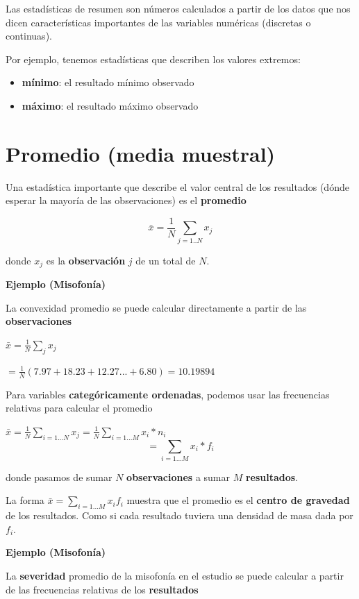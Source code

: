 \documentclass[
]{book}
\providecommand{\tightlist}{%
  \setlength{\itemsep}{0pt}\setlength{\parskip}{0pt}}
\begin{document}
Las estadísticas de resumen son números calculados a partir de los datos que nos dicen características importantes de las variables numéricas (discretas o continuas).

Por ejemplo, tenemos estadísticas que describen los valores extremos:

\begin{itemize}
\tightlist
\item
  \textbf{mínimo}: el resultado mínimo observado
\item
  \textbf{máximo}: el resultado máximo observado
\end{itemize}

\hypertarget{promedio-media-muestral}{%
\section{Promedio (media muestral)}\label{promedio-media-muestral}}

Una estadística importante que describe el valor central de los resultados (dónde esperar la mayoría de las observaciones) es el \textbf{promedio}

\[\bar{x}=\frac{1}{N} \sum_{j=1..N} x_j\]

donde \(x_j\) es la \textbf{observación} \(j\) de un total de \(N\).

\textbf{Ejemplo (Misofonía)}

La convexidad promedio se puede calcular directamente a partir de las \textbf{observaciones}

\(\bar{x}= \frac{1}{N}\sum_j x_j\)

\(= \frac{1}{N}(7.97 + 18.23 + 12.27... + 6.80) = 10.19894\)

Para variables \textbf{categóricamente ordenadas}, podemos usar las frecuencias relativas para calcular el promedio

\(\bar{x}=\frac{1}{N}\sum_{i=1...N} x_j=\frac{1}{N}\sum_{i=1...M} x_i*n_ {i}\)
\[=\sum_{i=1...M} x_i*f_{i}\]

donde pasamos de sumar \(N\) \textbf{observaciones} a sumar \(M\) \textbf{resultados}.

La forma \(\bar{x}= \sum_{i = 1...M} x_i f_i\) muestra que el promedio es el \textbf{centro de gravedad} de los resultados. Como si cada resultado tuviera una densidad de masa dada por \(f_i\).

\textbf{Ejemplo (Misofonía)}

La \textbf{severidad} promedio de la misofonía en el estudio se puede calcular a partir de las frecuencias relativas de los \textbf{resultados}
\end{document}
